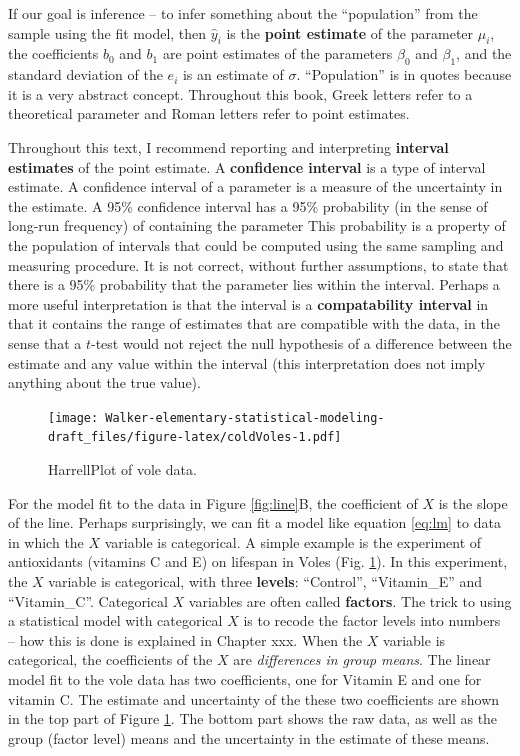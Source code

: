 \documentclass[]{book}
\begin{document}
If our goal is inference -- to infer something about the ``population''
from the sample using the fit model, then \(\hat{y}_i\) is the
\textbf{point estimate} of the parameter \(\mu_i\), the coefficients
\(b_0\) and \(b_1\) are point estimates of the parameters \(\beta_0\)
and \(\beta_1\), and the standard deviation of the \(e_i\) is an
estimate of \(\sigma\). ``Population'' is in quotes because it is a very
abstract concept. Throughout this book, Greek letters refer to a
theoretical parameter and Roman letters refer to point estimates.

Throughout this text, I recommend reporting and interpreting
\textbf{interval estimates} of the point estimate. A \textbf{confidence
interval} is a type of interval estimate. A confidence interval of a
parameter is a measure of the uncertainty in the estimate. A 95\%
confidence interval has a 95\% probability (in the sense of long-run
frequency) of containing the parameter This probability is a property of
the population of intervals that could be computed using the same
sampling and measuring procedure. It is not correct, without further
assumptions, to state that there is a 95\% probability that the
parameter lies within the interval. Perhaps a more useful interpretation
is that the interval is a \textbf{compatability interval} in that it
contains the range of estimates that are compatible with the data, in
the sense that a \(t\)-test would not reject the null hypothesis of a
difference between the estimate and any value within the interval (this
interpretation does not imply anything about the true value).

\begin{figure}
\centering
\texttt{[image: Walker-elementary-statistical-modeling-draft\_files/figure-latex/coldVoles-1.pdf]}
\caption{\label{fig:coldVoles}HarrellPlot of vole data.}
\end{figure}

For the model fit to the data in Figure \ref{fig:line}B, the coefficient
of \(X\) is the slope of the line. Perhaps surprisingly, we can fit a
model like equation \eqref{eq:lm} to data in which the \(X\) variable is
categorical. A simple example is the experiment of antioxidants
(vitamins C and E) on lifespan in Voles (Fig. \ref{fig:coldVoles}). In
this experiment, the \(X\) variable is categorical, with three
\textbf{levels}: ``Control'', ``Vitamin\_E'' and ``Vitamin\_C''.
Categorical \(X\) variables are often called \textbf{factors}. The trick
to using a statistical model with categorical \(X\) is to recode the
factor levels into numbers -- how this is done is explained in Chapter
xxx. When the \(X\) variable is categorical, the coefficients of the
\(X\) are \emph{differences in group means}. The linear model fit to the
vole data has two coefficients, one for Vitamin E and one for vitamin C.
The estimate and uncertainty of the these two coefficients are shown in
the top part of Figure \ref{fig:coldVoles}. The bottom part shows the
raw data, as well as the group (factor level) means and the uncertainty
in the estimate of these means.
\end{document}
